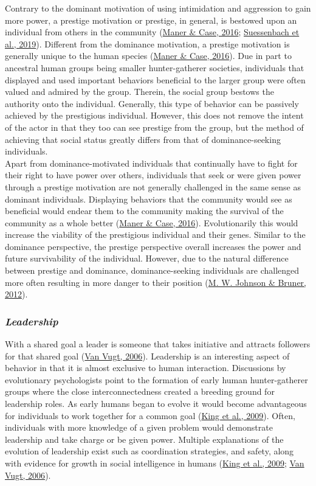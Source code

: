 \documentclass[
  donotrepeattitle,doc, 12pt, a4paper,floatsintext]{apa7}
\begin{document}
Contrary to the dominant motivation of using intimidation and aggression to gain more power, a prestige motivation or prestige, in general, is bestowed upon an individual from others in the community (\protect\hyperlink{ref-maner2016}{Maner \& Case, 2016}; \protect\hyperlink{ref-suessenbach2019}{Suessenbach et al., 2019}). Different from the dominance motivation, a prestige motivation is generally unique to the human species (\protect\hyperlink{ref-maner2016}{Maner \& Case, 2016}). Due in part to ancestral human groups being smaller hunter-gatherer societies, individuals that displayed and used important behaviors beneficial to the larger group were often valued and admired by the group. Therein, the social group bestows the authority onto the individual. Generally, this type of behavior can be passively achieved by the prestigious individual. However, this does not remove the intent of the actor in that they too can see prestige from the group, but the method of achieving that social status greatly differs from that of dominance-seeking individuals.\\
Apart from dominance-motivated individuals that continually have to fight for their right to have power over others, individuals that seek or were given power through a prestige motivation are not generally challenged in the same sense as dominant individuals. Displaying behaviors that the community would see as beneficial would endear them to the community making the survival of the community as a whole better (\protect\hyperlink{ref-maner2016}{Maner \& Case, 2016}). Evolutionarily this would increase the viability of the prestigious individual and their genes. Similar to the dominance perspective, the prestige perspective overall increases the power and future survivability of the individual. However, due to the natural difference between prestige and dominance, dominance-seeking individuals are challenged more often resulting in more danger to their position (\protect\hyperlink{ref-johnson2012}{M. W. Johnson \& Bruner, 2012}).
\hypertarget{leadership}{%
\subsubsection{\texorpdfstring{\emph{Leadership}}{Leadership}}\label{leadership}}
With a shared goal a leader is someone that takes initiative and attracts followers for that shared goal (\protect\hyperlink{ref-vanvugt2006}{Van Vugt, 2006}). Leadership is an interesting aspect of behavior in that it is almost exclusive to human interaction. Discussions by evolutionary psychologists point to the formation of early human hunter-gatherer groups where the close interconnectedness created a breeding ground for leadership roles. As early humans began to evolve it would become advantageous for individuals to work together for a common goal (\protect\hyperlink{ref-king2009}{King et al., 2009}). Often, individuals with more knowledge of a given problem would demonstrate leadership and take charge or be given power. Multiple explanations of the evolution of leadership exist such as coordination strategies, and safety, along with evidence for growth in social intelligence in humans (\protect\hyperlink{ref-king2009}{King et al., 2009}; \protect\hyperlink{ref-vanvugt2006}{Van Vugt, 2006}).\\
\end{document}
